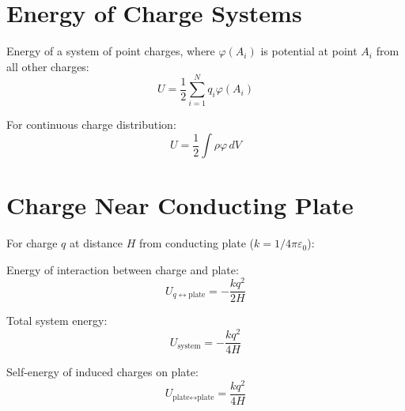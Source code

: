 \documentclass{article}
\begin{document}
\section*{Energy of Charge Systems}

Energy of a system of point charges, where $\varphi(A_i)$ is potential at point $A_i$ from all other charges:
\[
U=\frac{1}{2}\sum_{i=1}^N q_i\varphi(A_i)
\]

For continuous charge distribution:
\[
U=\frac{1}{2}\int \rho\varphi\,dV
\]

\section*{Charge Near Conducting Plate}

For charge $q$ at distance $H$ from conducting plate ($k=1/4\pi\varepsilon_0$):

Energy of interaction between charge and plate:
\[
U_{q\leftrightarrow \text{plate}}=-\frac{k q^2}{2H}
\]

Total system energy:
\[
U_{\text{system}}=-\frac{k q^2}{4H}
\]

Self-energy of induced charges on plate:
\[
U_{\text{plate}\leftrightarrow \text{plate}}=\frac{k q^2}{4H}
\]
\end{document}
